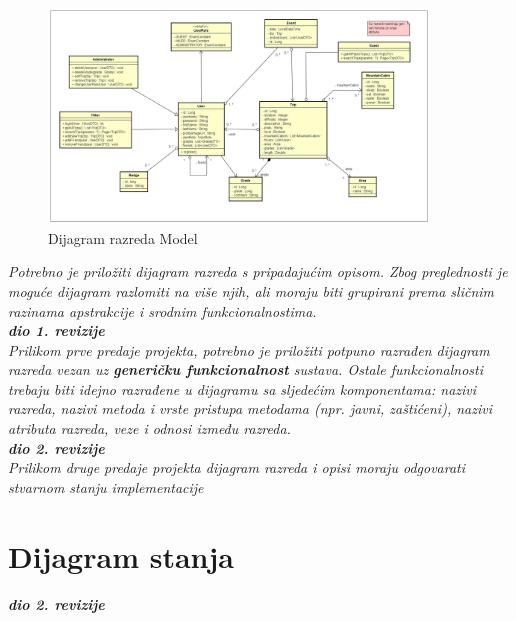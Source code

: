 			\begin{figure}[H]
				\centering
				\includegraphics[width=0.9\textwidth]{slike/Model_dijagram.jpg}
				\caption{Dijagram razreda Model}
				\label{fig:mesh1}
			\end{figure} 
			
			\textit{Potrebno je priložiti dijagram razreda s pripadajućim opisom. Zbog preglednosti je moguće dijagram razlomiti na više njih, ali moraju biti grupirani prema sličnim razinama apstrakcije i srodnim funkcionalnostima.}\\
			
			\textbf{\textit{dio 1. revizije}}\\
			
			\textit{Prilikom prve predaje projekta, potrebno je priložiti potpuno razrađen dijagram razreda vezan uz \textbf{generičku funkcionalnost} sustava. Ostale funkcionalnosti trebaju biti idejno razrađene u dijagramu sa sljedećim komponentama: nazivi razreda, nazivi metoda i vrste pristupa metodama (npr. javni, zaštićeni), nazivi atributa razreda, veze i odnosi između razreda.}\\
			
			\textbf{\textit{dio 2. revizije}}\\			
			
			\textit{Prilikom druge predaje projekta dijagram razreda i opisi moraju odgovarati stvarnom stanju implementacije}
			
			
			
			\eject
		
		\section{Dijagram stanja}
			
			
			\textbf{\textit{dio 2. revizije}}\\
			
